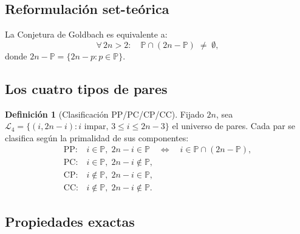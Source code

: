 \documentclass[11pt,a4paper]{article}
\theoremstyle{definition}
\newtheorem{definition}[theorem]{Definición}
\newcommand{\PP}{\mathbb{P}}          %
\begin{document}
\subsection{Reformulación set-teórica}

La Conjetura de Goldbach es equivalente a:
\[
    \forall\, 2n>2:\quad \PP \cap (2n-\PP) \;\neq\; \emptyset,
\]
donde $2n-\PP = \{2n-p : p\in\PP\}$.

\subsection{Los cuatro tipos de pares}

\begin{definition}[Clasificación PP/PC/CP/CC]
Fijado $2n$, sea $\mathcal{L}_4=\{(i,2n-i) : i\text{ impar},\,3\leq i\leq 2n-3\}$
el universo de pares.  Cada par se clasifica según la primalidad de sus
componentes:
\[
    \begin{array}{ll}
        \mathrm{PP}: & i\in\PP,\; 2n-i\in\PP \quad\Leftrightarrow\quad i\in\PP\cap(2n-\PP),\\
        \mathrm{PC}: & i\in\PP,\; 2n-i\notin\PP,\\
        \mathrm{CP}: & i\notin\PP,\; 2n-i\in\PP,\\
        \mathrm{CC}: & i\notin\PP,\; 2n-i\notin\PP.
    \end{array}
\]
\end{definition}

\subsection{Propiedades exactas}
\end{document}
